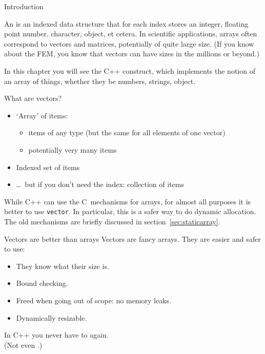 
 {Introduction}

An  is an indexed data structure that for each
index stores an integer, floating point number, character,
object, et cetera.
In scientific applications, arrays often correspond to vectors and
matrices, potentially of quite large size. (If you know about the
\acf{FEM}, you know that vectors can have sizes in the millions or beyond.)

In this chapter you will see the C++  construct,
which implements the notion of an array of things, whether they be
numbers, strings, object.

\begin{slide}{What are vectors?}
  \label{sl:what-vector}
  \begin{itemize}
  \item `Array' of items:
    \begin{itemize}
    \item items of any type (but the same for all elements of one
      vector)
    \item potentially very many items
    \end{itemize}
  \item Indexed set of items
  \item \ldots~but if you don't need the index: collection of items
  \end{itemize}
\end{slide}

While C++ can use the C~mechanisms for arrays, for almost all purposes
it is better to use \lstinline{vector}. In particular, this is a safer way to
do dynamic allocation. The old
mechanisms are briefly discussed in section~\ref{sec:staticarray}.

\begin{slide}{Vectors are better than arrays}
  \label{sl:vector-why}
  Vectors are fancy arrays. They are easier and safer to use:
  \begin{itemize}
  \item They know what their size is.
  \item Bound checking.
  \item Freed when going out of scope: no memory leaks.
  \item Dynamically resizable.
  \end{itemize}
  In C++ you never have to  again.\\
  (Not even .)
\end{slide}

